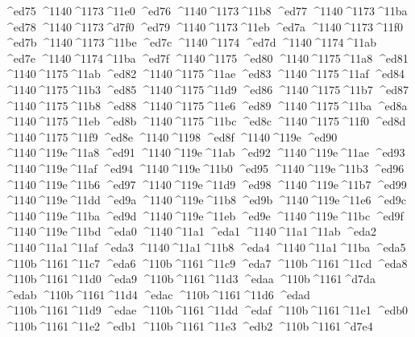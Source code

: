 \checkit ^^^^ed75 ^^^^1140^^^^1173^^^^11e0
\checkit ^^^^ed76 ^^^^1140^^^^1173^^^^11b8
\checkit ^^^^ed77 ^^^^1140^^^^1173^^^^11ba
\checkit ^^^^ed78 ^^^^1140^^^^1173^^^^d7f0
\checkit ^^^^ed79 ^^^^1140^^^^1173^^^^11eb
\checkit ^^^^ed7a ^^^^1140^^^^1173^^^^11f0
\checkit ^^^^ed7b ^^^^1140^^^^1173^^^^11be
\checkit ^^^^ed7c ^^^^1140^^^^1174
\checkit ^^^^ed7d ^^^^1140^^^^1174^^^^11ab
\checkit ^^^^ed7e ^^^^1140^^^^1174^^^^11ba
\checkit ^^^^ed7f ^^^^1140^^^^1175
\checkit ^^^^ed80 ^^^^1140^^^^1175^^^^11a8
\checkit ^^^^ed81 ^^^^1140^^^^1175^^^^11ab
\checkit ^^^^ed82 ^^^^1140^^^^1175^^^^11ae
\checkit ^^^^ed83 ^^^^1140^^^^1175^^^^11af
\checkit ^^^^ed84 ^^^^1140^^^^1175^^^^11b3
\checkit ^^^^ed85 ^^^^1140^^^^1175^^^^11d9
\checkit ^^^^ed86 ^^^^1140^^^^1175^^^^11b7
\checkit ^^^^ed87 ^^^^1140^^^^1175^^^^11b8
\checkit ^^^^ed88 ^^^^1140^^^^1175^^^^11e6
\checkit ^^^^ed89 ^^^^1140^^^^1175^^^^11ba
\checkit ^^^^ed8a ^^^^1140^^^^1175^^^^11eb
\checkit ^^^^ed8b ^^^^1140^^^^1175^^^^11bc
\checkit ^^^^ed8c ^^^^1140^^^^1175^^^^11f0
\checkit ^^^^ed8d ^^^^1140^^^^1175^^^^11f9
\checkit ^^^^ed8e ^^^^1140^^^^1198
\checkit ^^^^ed8f ^^^^1140^^^^119e
\checkit ^^^^ed90 ^^^^1140^^^^119e^^^^11a8
\checkit ^^^^ed91 ^^^^1140^^^^119e^^^^11ab
\checkit ^^^^ed92 ^^^^1140^^^^119e^^^^11ae
\checkit ^^^^ed93 ^^^^1140^^^^119e^^^^11af
\checkit ^^^^ed94 ^^^^1140^^^^119e^^^^11b0
\checkit ^^^^ed95 ^^^^1140^^^^119e^^^^11b3
\checkit ^^^^ed96 ^^^^1140^^^^119e^^^^11b6
\checkit ^^^^ed97 ^^^^1140^^^^119e^^^^11d9
\checkit ^^^^ed98 ^^^^1140^^^^119e^^^^11b7
\checkit ^^^^ed99 ^^^^1140^^^^119e^^^^11dd
\checkit ^^^^ed9a ^^^^1140^^^^119e^^^^11b8
\checkit ^^^^ed9b ^^^^1140^^^^119e^^^^11e6
\checkit ^^^^ed9c ^^^^1140^^^^119e^^^^11ba
\checkit ^^^^ed9d ^^^^1140^^^^119e^^^^11eb
\checkit ^^^^ed9e ^^^^1140^^^^119e^^^^11bc
\checkit ^^^^ed9f ^^^^1140^^^^119e^^^^11bd
\checkit ^^^^eda0 ^^^^1140^^^^11a1
\checkit ^^^^eda1 ^^^^1140^^^^11a1^^^^11ab
\checkit ^^^^eda2 ^^^^1140^^^^11a1^^^^11af
\checkit ^^^^eda3 ^^^^1140^^^^11a1^^^^11b8
\checkit ^^^^eda4 ^^^^1140^^^^11a1^^^^11ba
\checkit ^^^^eda5 ^^^^110b^^^^1161^^^^11c7
\checkit ^^^^eda6 ^^^^110b^^^^1161^^^^11c9
\checkit ^^^^eda7 ^^^^110b^^^^1161^^^^11cd
\checkit ^^^^eda8 ^^^^110b^^^^1161^^^^11d0
\checkit ^^^^eda9 ^^^^110b^^^^1161^^^^11d3
\checkit ^^^^edaa ^^^^110b^^^^1161^^^^d7da
\checkit ^^^^edab ^^^^110b^^^^1161^^^^11d4
\checkit ^^^^edac ^^^^110b^^^^1161^^^^11d6
\checkit ^^^^edad ^^^^110b^^^^1161^^^^11d9
\checkit ^^^^edae ^^^^110b^^^^1161^^^^11dd
\checkit ^^^^edaf ^^^^110b^^^^1161^^^^11e1
\checkit ^^^^edb0 ^^^^110b^^^^1161^^^^11e2
\checkit ^^^^edb1 ^^^^110b^^^^1161^^^^11e3
\checkit ^^^^edb2 ^^^^110b^^^^1161^^^^d7e4
